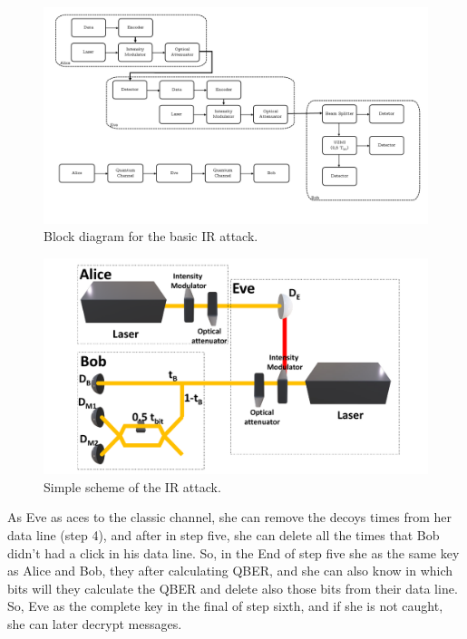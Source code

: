 \begin{refsection}
\begin{figure}[h]
\centering
\includegraphics[width=1\linewidth]{./sdf/tq_76558_cow_protocol/slides/figures/Diagrama_de_blocos.pdf}
\caption{Block diagram for the basic IR attack.}
\label{fig:bloc}
\end{figure}

\begin{figure}[h]
\centering
\includegraphics[width=1\linewidth]{./sdf/tq_76558_cow_protocol/slides/figures/E.pdf}
\caption{Simple scheme of the IR attack.}
\label{fig:E}
\end{figure}

As Eve as aces to the classic channel, she can remove the decoys times from her data line (step 4), and after in step five, she can delete all the times that Bob didn't had a click in his data line. So, in the End of step five she as the same key as Alice and Bob, they after calculating QBER, and she can also know in which bits will they calculate the QBER and delete also those bits from their data line. So, Eve as the complete key in the final of step sixth, and if she is not caught, she can later decrypt messages.


\end{refsection}
